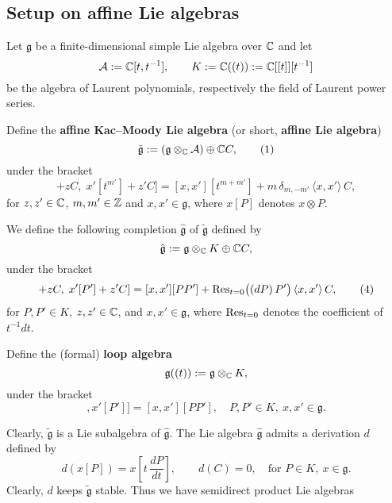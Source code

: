 \documentclass[12pt]{article}
\begin{document}
\subsection{Setup on affine Lie algebras}
Let $\mathfrak{g}$ be a finite-dimensional simple Lie algebra over $\mathbb{C}$ and let
\[
    \mathcal{A} := \mathbb{C}[t,t^{-1}], \qquad
    K := \mathbb{C}((t)) := \mathbb{C}[[t]][t^{-1}]
\]
be the algebra of Laurent polynomials, respectively the field of Laurent power series.
\begin{definition}

    Define the \textbf{affine Kac--Moody Lie algebra} (or short, \textbf{affine Lie algebra})
    \[
        \tilde{\mathfrak g} := (\mathfrak g \otimes_{\mathbb{C}} \mathcal{A}) \oplus \mathbb{C} C,
        \tag{1}
    \]
    under the bracket
    \begin{equation}
        [x[t^m] + zC,\; x'[t^{m'}] + z'C]
        = [x,x'][t^{m+m'}] + m\,\delta_{m,-m'}\,\langle x,x'\rangle\,C,
        \tag{2}
    \end{equation}
    for $z,z' \in \mathbb{C}$, $m,m' \in \mathbb{Z}$ and $x,x' \in \mathfrak g$, where $x[P]$ denotes $x\otimes P$.

    We define the following completion $\hat{\mathfrak g}$ of $\tilde{\mathfrak g}$ defined by
    \[
        \hat{\mathfrak g} := \mathfrak g \otimes_{\mathbb{C}} K \oplus \mathbb{C} C,
    \]
    under the bracket
    \begin{equation}
        [x[P] + zC,\; x'[P'] + z'C]
        = [x,x'][PP'] + \Res_{t=0}\!\big((dP)\,P'\big)\,\langle x,x'\rangle\,C,
        \tag{4}
    \end{equation}
    for $P,P'\in K$, $z,z'\in\mathbb{C}$, and $x,x'\in\mathfrak g$, where $\operatorname{Res}_{t=0}$ denotes the coefficient of $t^{-1}dt$.

    Define the (formal) \textbf{loop algebra}
    \[
        \mathfrak g((t)) := \mathfrak g \otimes_{\mathbb{C}} K,
    \]
    under the bracket
    \begin{equation}
        [x[P],x'[P']] = [x,x'][PP'], \quad P,P'\in K,\ x,x'\in\mathfrak g.
        \tag{7}
    \end{equation}
\end{definition}
Clearly, $\tilde{\mathfrak g}$ is a Lie subalgebra of $\hat{\mathfrak g}$.
The Lie algebra $\hat{\mathfrak g}$ admits a derivation $d$ defined by
\begin{equation}
    d(x[P]) = x\!\left[t\,\frac{dP}{dt}\right],
    \qquad d(C)=0,
    \quad\text{for } P\in K,\ x\in\mathfrak g.
    \tag{5}
\end{equation}
Clearly, $d$ keeps $\tilde{\mathfrak g}$ stable. Thus we have semidirect product Lie algebras
\end{document}
